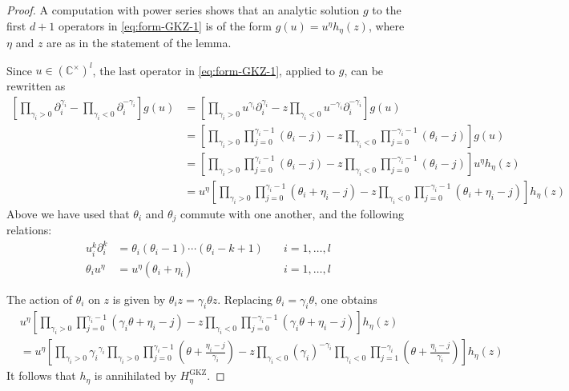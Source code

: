 \documentclass[11pt, reqno]{amsart}
\theoremstyle{plain}
\theoremstyle{definition}
\newcommand{\ga}{\gamma}
\newcommand{\Gm}{{\mathbb{C}^\times}}
\begin{document}
\begin{proof}  
A computation with power series shows that
an analytic solution $g$ to the first $d+1$ operators in \eqref{eq:form-GKZ-1} is of the form $
g(u) = u^\eta h_\eta(z)$, where $\eta$ and $z$ are as in the statement of the lemma.

Since $u \in (\Gm)^l$, the last operator in \eqref{eq:form-GKZ-1}, applied to $g$, can be rewritten as 
\begin{align*}   
\left[ \prod_{\ga_i >0} \partial_i^{\gamma_i}- \prod_{\gamma_i<0 }  \partial_i^{-\gamma_i}\right] g(u) &=\left[ \prod_{\ga_i >0} u^{\gamma_i} \partial_i^{\gamma_i}- z\prod_{\gamma_i<0 }  u^{-\gamma_i} \partial_i^{-\gamma_i}\right] g(u)  \\
&= \left[  \prod_{\ga_i >0}  \prod_{j=0}^{\gamma_i-1}( \theta_i - j )- z\prod_{\ga_i <0}  \prod_{j=0}^{-\gamma_i-1}( \theta_i - j ) \right] g(u)\\
&= \left[  \prod_{\ga_i >0}  \prod_{j=0}^{\gamma_i-1}( \theta_i - j )- z\prod_{\ga_i <0}  \prod_{j=0}^{-\gamma_i-1}( \theta_i - j ) \right]u^\eta h_\eta(z) \\
&= u^\eta \left[  \prod_{\ga_i >0}  \prod_{j=0}^{\gamma_i-1}( \theta_i +\eta_i- j )- z\prod_{\ga_i <0}  \prod_{j=0}^{-\gamma_i-1}( \theta_i+\eta_i - j ) \right] h_\eta(z)
\end{align*}
Above we have used that $\theta_i$ and $\theta_j$ commute with one another, and the following relations:
\begin{align*}
    u_i^k \partial_i^k &= \theta_i(\theta_i-1)\cdots (\theta_i-k+1) \quad & i=1,\dots,l\\
    \theta_i u^{\eta}&= u^{\eta} (\theta_i+\eta_i) \quad & i=1,\dots,l
\end{align*}

The action of $\theta_i$ on $z$ is given by $\theta_iz=\gamma_i \theta z$. 
Replacing $\theta_i=\gamma_i \theta$, one obtains
\begin{align*}
& u^\eta \left[ \prod_{\ga_i >0}  \prod_{j=0}^{\gamma_i-1}( \gamma_i \theta +\eta_i- j )- z\prod_{\ga_i <0}  \prod_{j=0}^{-\gamma_i-1}( \gamma_i \theta+\eta_i - j) \right] h_\eta(z)\\
& =  u^{\eta} \left[  \prod_{\gamma_i>0}{\gamma_i}^{\gamma_i} \prod_{\ga_i >0}  \prod_{j=0}^{\gamma_i-1}\left( \theta + \frac{\eta_i- j}{\gamma_i} \right)- z \prod_{\gamma_i<0} (\gamma_i) ^{-\gamma_i}  \prod_{\ga_i <0}  \prod_{j=1}^{-\gamma_i} \left( \theta+ \frac{\eta_i - j}{\gamma_i} \right) \right] h_\eta(z)
\end{align*}
It follows that $h_\eta$ is annihilated by $H^{\mathrm{GKZ}}_\eta$.
\end{proof}
\end{document}
